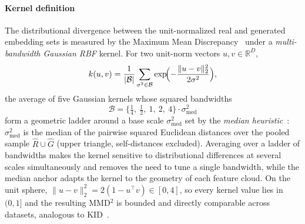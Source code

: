 \documentclass[lettersize,journal]{IEEEtran}
\begin{document}
\paragraph{Kernel definition}
The distributional divergence between the unit-normalized real and
generated embedding sets is measured by the Maximum Mean
Discrepancy~\cite{gretton2012kernel} under a \emph{multi-bandwidth
Gaussian RBF} kernel. For two unit-norm vectors $u, v \in \mathbb{R}^D$,
\begin{equation}
  \label{eq:kernel}
  k(u, v) = \frac{1}{|\mathcal{B}|}
            \sum_{\sigma^2 \in \mathcal{B}}
            \exp\!\Bigl(
              -\frac{\lVert u - v \rVert_2^2}{2\sigma^2}
            \Bigr),
\end{equation}
the average of five Gaussian kernels whose squared bandwidths
\begin{equation}
  \label{eq:bandwidths}
  \mathcal{B} = \bigl\{\tfrac14,\ \tfrac12,\ 1,\ 2,\ 4\bigr\}
                \cdot \sigma_\mathrm{med}^2
\end{equation}
form a geometric ladder around a base scale $\sigma_\mathrm{med}^2$ set
by the \emph{median heuristic}~\cite{gretton2012kernel}:
$\sigma_\mathrm{med}^2$ is the median of the pairwise squared Euclidean
distances over the pooled sample $\hat{R} \cup \hat{G}$ (upper triangle,
self-distances excluded).
Averaging over a ladder of bandwidths makes the kernel sensitive to
distributional differences at several scales simultaneously and removes
the need to tune a single bandwidth, while the median anchor adapts the
kernel to the geometry of each feature cloud.
On the unit sphere, $\lVert u - v \rVert_2^2 = 2(1 - u^\top v) \in [0,4]$,
so every kernel value lies in $(0, 1]$ and the resulting MMD$^2$ is
bounded and directly comparable across datasets, analogous to
KID~\cite{binkowski2018demystifying}.
\end{document}
